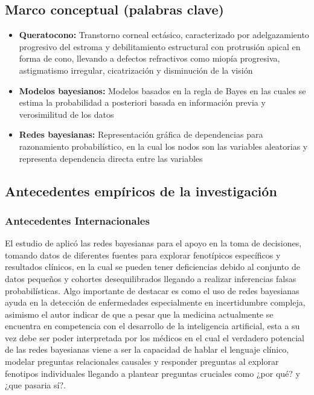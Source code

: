 \subsection{Marco conceptual (palabras clave)}

\begin{itemize}
\item \textbf{Queratocono:} Transtorno corneal ectásico, caracterizado por adelgazamiento progresivo del estroma y debilitamiento estructural con protrusión apical en forma de cono, llevando a defectos refractivos como miopía progresiva, astigmatismo irregular, cicatrización y disminución de la visión \cite{caruso2024corneal}

\item \textbf{Modelos bayesianos:} Modelos basados en la regla de Bayes en las cuales se estima la probabilidad a posteriori basada en información previa y verosimilitud de los datos \cite{koski2011bayesian}

\item \textbf{Redes bayesianas:} Representación gráfica de dependencias para razonamiento probabilístico, en la cual los nodos son las variables aleatorias y representa dependencia directa entre las variables \cite{sucar2006redes}
\end{itemize}


\subsection{Antecedentes empíricos de la investigación}
\subsubsection{Antecedentes Internacionales}
El estudio de \cite{waddell2023applying} aplicó las redes bayesianas para el apoyo en la toma de decisiones, tomando datos de diferentes fuentes para explorar fenotípicos específicos y resultados clínicos, en la cual se pueden tener deficiencias debido al conjunto de datos pequeños y cohortes desequilibrados llegando a realizar inferencias falsas probabilísticas. Algo importante de destacar es como el uso de redes bayesianas ayuda en la detección de enfermedades especialmente en incertidumbre compleja, asimismo el autor indicar de que a pesar que la medicina actualmente se encuentra en competencia con el desarrollo de la inteligencia artificial, esta a su vez debe ser poder interpretada por los médicos en el cual el verdadero potencial de las redes bayesianas viene a ser la capacidad de hablar el lenguaje clínico, modelar preguntas relacionales causales y responder preguntas al explorar fenotipos individuales llegando a plantear preguntas cruciales como ¿por qué? y ¿que pasaria sí?. \\

